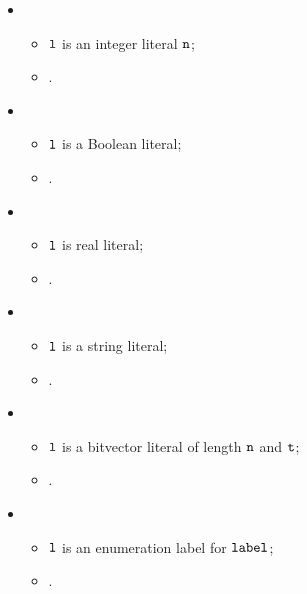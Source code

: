 \ProseParagraph
\OneApplies
\begin{itemize}
  \item {}
  \begin{itemize}
    \item $\texttt{l}$ is an integer literal $\texttt{n}$;
    \item {}.
  \end{itemize}

  \item {}
  \begin{itemize}
    \item $\texttt{l}$ is a Boolean literal;
    \item {}.
  \end{itemize}

  \item {}
  \begin{itemize}
    \item $\texttt{l}$ is real literal;
    \item {}.
  \end{itemize}

  \item {}
  \begin{itemize}
    \item $\texttt{l}$ is a string literal;
    \item {}.
  \end{itemize}

  \item {}
  \begin{itemize}
    \item $\texttt{l}$ is a bitvector literal of length $\texttt{n}$ and $\texttt{t}$;
    \item {}.
  \end{itemize}

  \item {}
  \begin{itemize}
    \item $\texttt{l}$ is an enumeration label for $\texttt{label}$;
    \item {}.
  \end{itemize}
\end{itemize}

